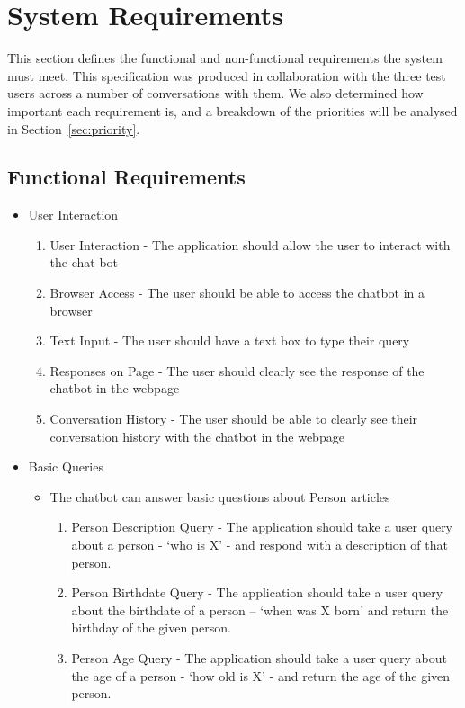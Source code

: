 \newpage
\section{System Requirements}
\label{sec:requirements}
This section defines the functional and non-functional requirements the system must meet. This specification was produced in collaboration with the three test users across a number of conversations with them. We also determined how important each requirement is, and a breakdown of the priorities will be analysed in Section~\ref{sec:priority}.

\subsection{Functional Requirements}

\begin{itemize}
	\item User Interaction
	\begin{enumerate}[label*=F\arabic*.]
		\item User Interaction - The application should allow the user to interact with the chat bot
		\item Browser Access - The user should be able to access the chatbot in a browser
		\item Text Input - The user should have a text box to type their query
		\item Responses on Page - The user should clearly see the response of the chatbot in the webpage
		\item Conversation History - The user should be able to clearly see their conversation history with the chatbot in the webpage
	\end{enumerate}
	\item Basic Queries
	\begin{itemize}
		\item The chatbot can answer basic questions about Person articles
		\begin{enumerate}[resume*]
			\item Person Description Query - The application should take a user query about a person - ‘who is X’ - and respond with a description of that person.
			\item Person Birthdate Query - The application should take a user query about the birthdate of a person – ‘when was X born’ and return the birthday of the given person.
			\item Person Age Query - The application should take a user query about the age of a person - ‘how old is X’ - and return the age of the given person.

\end{enumerate}
\end{itemize}
\end{itemize}
